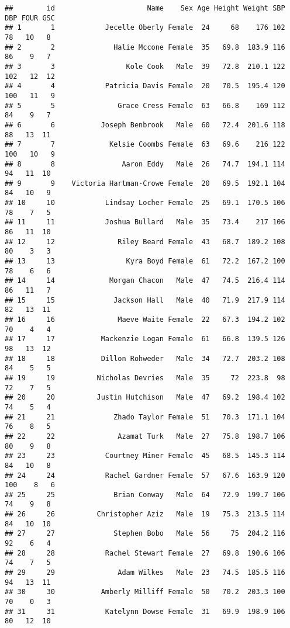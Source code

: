 \documentclass[
]{article}
\begin{document}
\begin{verbatim}
##        id                      Name    Sex Age Height Weight SBP DBP FOUR GSC
## 1       1            Jecelle Oberly Female  24     68    176 102  78   10   8
## 2       2              Halie Mccone Female  35   69.8  183.9 116  86    9   7
## 3       3                 Kole Cook   Male  39   72.8  210.1 122 102   12  12
## 4       4            Patricia Davis Female  20   70.5  195.4 120 100   11   9
## 5       5               Grace Cress Female  63   66.8    169 112  84    9   7
## 6       6           Joseph Benbrook   Male  60   72.4  201.6 118  88   13  11
## 7       7             Kelsie Coombs Female  63   69.6    216 122 100   10   9
## 8       8                Aaron Eddy   Male  26   74.7  194.1 114  94   11  10
## 9       9    Victoria Hartman-Crowe Female  20   69.5  192.1 104  84   10   9
## 10     10            Lindsay Locher Female  25   69.1  170.5 106  78    7   5
## 11     11            Joshua Bullard   Male  35   73.4    217 106  86   11  10
## 12     12               Riley Beard Female  43   68.7  189.2 108  80    3   3
## 13     13                 Kyra Boyd Female  61   72.2  167.2 100  78    6   6
## 14     14             Morgan Chacon   Male  47   74.5  216.4 114  86   11   7
## 15     15              Jackson Hall   Male  40   71.9  217.9 114  82   13  11
## 16     16               Maeve Waite Female  22   67.3  194.2 102  70    4   4
## 17     17           Mackenzie Logan Female  61   66.8  139.5 126  98   13  12
## 18     18           Dillon Rohweder   Male  34   72.7  203.2 108  84    5   5
## 19     19          Nicholas Devries   Male  35     72  223.8  98  72    7   5
## 20     20          Justin Hutchison   Male  47   69.2  198.4 102  74    5   4
## 21     21              Zhado Taylor Female  51   70.3  171.1 104  76    8   5
## 22     22               Azamat Turk   Male  27   75.8  198.7 106  80    9   8
## 23     23            Courtney Miner Female  45   68.5  145.3 114  84   10   8
## 24     24            Rachel Gardner Female  57   67.6  163.9 120 100    8   6
## 25     25              Brian Conway   Male  64   72.9  199.7 106  74    9   8
## 26     26          Christopher Aziz   Male  19   75.3  213.5 114  84   10  10
## 27     27              Stephen Bobo   Male  56     75  204.2 116  92    6   4
## 28     28            Rachel Stewart Female  27   69.8  190.6 106  74    7   5
## 29     29               Adam Wilkes   Male  23   74.5  185.5 116  94   13  11
## 30     30           Amberly Milliff Female  50   70.2  203.3 100  70    0   3
## 31     31            Katelynn Dowse Female  31   69.9  198.9 106  80   12  10

\end{verbatim}
\end{document}

